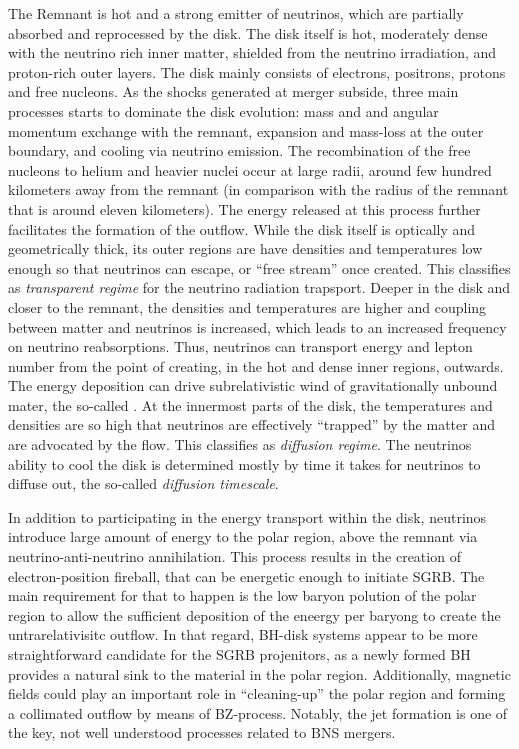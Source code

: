 The Remnant is hot and a strong emitter of neutrinos, which are partially absorbed 
and reprocessed by the disk. 
The disk itself is hot, moderately dense with the neutrino rich inner matter, shielded from 
the neutrino irradiation, and proton-rich outer layers. The disk mainly consists of 
electrons, positrons, protons and free nucleons. As the shocks generated at merger 
subside, three main processes starts to dominate the disk evolution: mass and and 
angular momentum exchange with the remnant, expansion and mass-loss at the outer 
boundary, and cooling via neutrino emission. The recombination of the free nucleons 
to helium and heavier nuclei occur at large radii, around few hundred kilometers 
away from the remnant (in comparison with the radius of the remnant that is around 
eleven kilometers). The energy released at this process further facilitates the 
formation of the outflow. While the disk itself is optically and geometrically 
thick, its outer regions are have densities and temperatures low enough so that 
neutrinos can escape, or ``free stream'' once created. This classifies as 
\textit{transparent regime} for the neutrino radiation trapsport. 
Deeper in the disk and closer to the remnant, the densities and temperatures are 
higher and coupling between matter and neutrinos is increased, which leads to 
an increased frequency on neutrino reabsorptions. Thus, neutrinos can transport 
energy and lepton number from the point of creating, in the hot and dense inner 
regions, outwards. The energy deposition can drive subrelativistic wind of 
gravitationally unbound mater, the so-called \nwind{}.  
At the innermost parts of the disk, the temperatures and densities are so high 
that neutrinos are effectively ``trapped'' by the matter and are advocated by the 
flow. This classifies as \textit{diffusion regime}. The neutrinos ability to 
cool the disk is determined mostly by time it takes for neutrinos to diffuse out,
the so-called \textit{diffusion timescale}.

In addition to participating in the energy transport within the disk, neutrinos 
introduce large amount of energy to the polar region, above the remnant via 
neutrino-anti-neutrino annihilation. This process results in the creation of 
electron-position fireball, that can be energetic enough to initiate \ac{SGRB}. 
The main requirement for that to happen is the low baryon polution of the polar 
region to allow the sufficient deposition of the eneergy per baryong to create the 
untrarelativisitc outflow. In that regard, BH-disk systems appear to be more 
straightforward candidate for the \ac{SGRB} projenitors, as a newly formed \ac{BH} 
provides a natural sink to the material in the polar region. 
Additionally, magnetic fields could play an important role in ``cleaning-up'' the 
polar region and forming a collimated outflow by means of BZ-process. 
Notably, the jet formation is one of the key, not well understood processes 
related to \ac{BNS} mergers.


